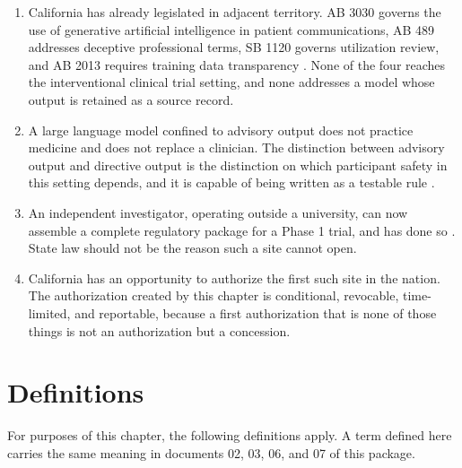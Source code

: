 \begin{enumerate}
\item California has already legislated in adjacent territory. AB 3030 governs
  the use of generative artificial intelligence in patient communications,
  AB 489 addresses deceptive professional terms, SB 1120 governs utilization
  review, and AB 2013 requires training data transparency
  \cite{ab3030_2024,ab489_2025,sb1120_2024,ab2013_2024}. None of the four
  reaches the interventional clinical trial setting, and none addresses a model
  whose output is retained as a source record.

\item A large language model confined to advisory output does not practice
  medicine and does not replace a clinician. The distinction between advisory
  output and directive output is the distinction on which participant safety in
  this setting depends, and it is capable of being written as a testable rule
  \cite{cliniciantrust}.

\item An independent investigator, operating outside a university, can now
  assemble a complete regulatory package for a Phase 1 trial, and has done so
  \cite{phase1protocol,indapp}. State law should not be the reason such a site
  cannot open.

\item California has an opportunity to authorize the first such site in the
  nation. The authorization created by this chapter is conditional, revocable,
  time-limited, and reportable, because a first authorization that is none of
  those things is not an authorization but a concession.
\end{enumerate}

\section{Definitions}

For purposes of this chapter, the following definitions apply. A term defined
here carries the same meaning in documents 02, 03, 06, and 07 of this package.


